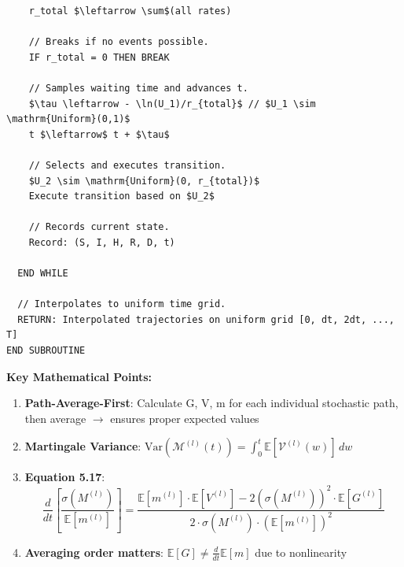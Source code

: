 \documentclass{article}
\begin{document}
\begin{lstlisting}
    r_total $\leftarrow \sum$(all rates)
   
    // Breaks if no events possible.
    IF r_total = 0 THEN BREAK
   
    // Samples waiting time and advances t.
    $\tau \leftarrow - \ln(U_1)/r_{total}$ // $U_1 \sim \mathrm{Uniform}(0,1)$
    t $\leftarrow$ t + $\tau$
   
    // Selects and executes transition.
    $U_2 \sim \mathrm{Uniform}(0, r_{total})$
    Execute transition based on $U_2$
   
    // Records current state.
    Record: (S, I, H, R, D, t)
 
  END WHILE
 
  // Interpolates to uniform time grid.
  RETURN: Interpolated trajectories on uniform grid [0, dt, 2dt, ..., T]
END SUBROUTINE
\end{lstlisting}
\textbf{Key Mathematical Points:}
\begin{enumerate}
  \item \textbf{Path-Average-First}: Calculate G, V, m for each individual stochastic path, then average $\to$ ensures proper expected values
  \item \textbf{Martingale Variance}: $\mathrm{Var}(\mathcal{M}^{(l)}(t)) = \int_0^t \mathbb{E}[\mathcal{V}^{(l)}(w)] \, dw$
  \item \textbf{Equation 5.17}:
  \[
  \frac{d}{dt}\left[\frac{\sigma(M^{(l)})}{\mathbb{E}[m^{(l)}]}\right] = \frac{\mathbb{E}[m^{(l)}] \cdot \mathbb{E}[V^{(l)}] - 2(\sigma(M^{(l)}))^2 \cdot \mathbb{E}[G^{(l)}]}{2 \cdot \sigma(M^{(l)}) \cdot (\mathbb{E}[m^{(l)}])^2}
  \]
  \item \textbf{Averaging order matters}: $\mathbb{E}[G] \neq \frac{d}{dt}\mathbb{E}[m]$ due to nonlinearity
\end{enumerate}
\end{document}

